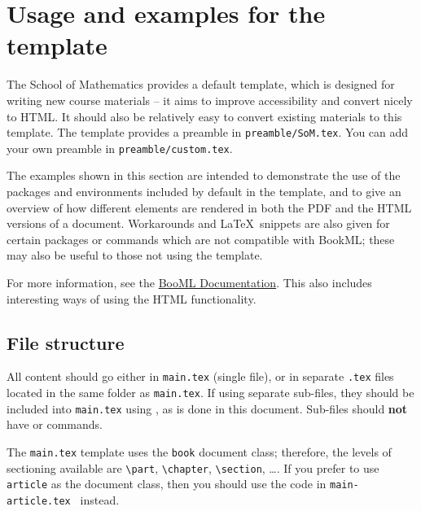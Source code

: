 \chapter{Usage and examples for the template}
\label{demo}

The School of Mathematics provides a default template, which is designed for writing new course materials -- it aims to improve accessibility and convert nicely to HTML. It should also be relatively easy to convert existing materials to this template. The template provides a preamble in \texttt{preamble/SoM.tex}. You can add your own preamble in \texttt{preamble/custom.tex}.

The examples shown in this section are intended to demonstrate the use of the packages and environments included by default in the template, and to give an overview of how different elements are rendered in both the PDF and the HTML versions of a document. Workarounds and \LaTeX\ snippets are also given for certain packages or commands which are not compatible with BookML; these may also be useful to those not using the template.

For more information, see the \href{https://vlmantova.github.io/bookml/#S3.SS1}{BooML Documentation}. This also includes interesting ways of using the HTML functionality.

\section{File structure}
\label{demo:struct}


All content should go either in \texttt{main.tex} (single file), or in separate \texttt{.tex} files located in the same folder as \texttt{main.tex}. If using separate sub-files, they should be included into \texttt{main.tex} using \verb||, as is done in this document. Sub-files should \textbf{not} have \verb|| or \verb|| commands.

The \texttt{main.tex} template uses the \texttt{book} document class; therefore, the levels of sectioning available are \verb|\part|, \verb|\chapter|, \verb|\section|, \ldots. If you prefer to use \texttt{article} as the document class, then you should use the code in \texttt{main-article.tex~} instead.

